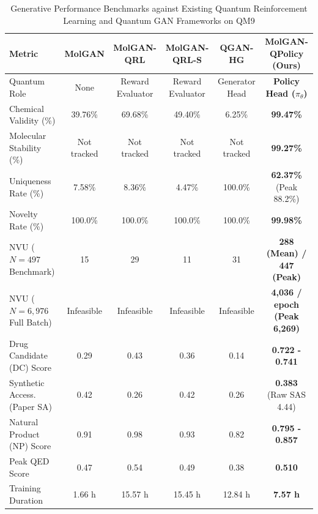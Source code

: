 \documentclass[10pt,twocolumn,a4paper]{article}
\begin{document}
\begin{table}[t]
\centering
\scriptsize
\caption{Generative Performance Benchmarks against Existing Quantum Reinforcement Learning and Quantum GAN Frameworks on QM9}
\label{tab:comparison}
\setlength{\tabcolsep}{2.5pt}
\begin{tabular*}{\textwidth}{@{\extracolsep{\fill}}lccccc@{}}
\toprule
\textbf{Metric} & \textbf{MolGAN \cite{decao2018}} & \textbf{MolGAN-QRL \cite{hergli2026}} & \textbf{MolGAN-QRL-S \cite{hergli2026}} & \textbf{QGAN-HG \cite{hergli2026}} & \textbf{MolGAN-QPolicy (Ours)} \\
\midrule
Quantum Role & None & Reward Evaluator & Reward Evaluator & Generator Head & \textbf{Policy Head ($\pi_\theta$)} \\
Chemical Validity (\%) & 39.76\% & 69.68\% & 49.40\% & 6.25\% & \textbf{99.47\%} \\
Molecular Stability (\%) & Not tracked & Not tracked & Not tracked & Not tracked & \textbf{99.27\%} \\
Uniqueness Rate (\%) & 7.58\% & 8.36\% & 4.47\% & 100.0\% & \textbf{62.37\%} (Peak 88.2\%) \\
Novelty Rate (\%) & 100.0\% & 100.0\% & 100.0\% & 100.0\% & \textbf{99.98\%} \\
NVU ($N=497$ Benchmark) & 15 & 29 & 11 & 31 & \textbf{288 (Mean) / 447 (Peak)} \\
NVU ($N=6,976$ Full Batch) & Infeasible & Infeasible & Infeasible & Infeasible & \textbf{4,036 / epoch (Peak 6,269)} \\
Drug Candidate (DC) Score & 0.29 & 0.43 & 0.36 & 0.14 & \textbf{0.722 - 0.741} \\
Synthetic Access. (Paper SA) & 0.42 & 0.26 & 0.42 & 0.26 & \textbf{0.383} (Raw SAS 4.44) \\
Natural Product (NP) Score & 0.91 & 0.98 & 0.93 & 0.82 & \textbf{0.795 - 0.857} \\
Peak QED Score & 0.47 & 0.54 & 0.49 & 0.38 & \textbf{0.510} \\
Training Duration & 1.66 h & 15.57 h & 15.45 h & 12.84 h & \textbf{7.57 h} \\
\bottomrule
\end{tabular*}
\end{table}
\end{document}
